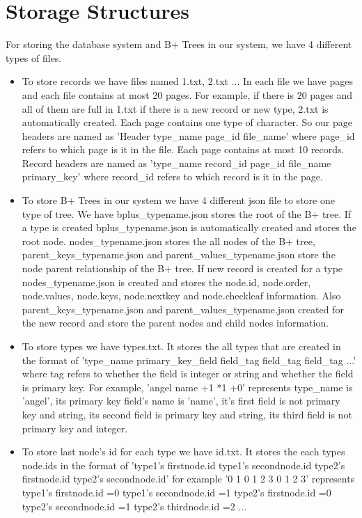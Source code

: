 \documentclass{article}
\begin{document}
\section{Storage Structures}
For storing the database system and B+ Trees in our system, we have 4 different types of files. \begin{itemize}
    \item To store records we have files named 1.txt, 2.txt ... In each file we have pages and each file contains at most 20 pages. For example, if there is 20 pages and all of them are full in 1.txt if there is a new record or new type, 2.txt is automatically created. Each page contains one type of character. So our page headers are named as 'Header type\_name page\_id file\_name' where page\_id refers to which page is it in the file. Each page contains at most 10 records. Record headers are named as 'type\_name record\_id page\_id file\_name primary\_key' where record\_id refers to which record is it in the page.
    \item To store B+ Trees in our system we have 4 different json file to store one type of tree.  We have bplus\_typename.json stores the root of the B+ tree. If a type is created bplus\_typename.json is automatically created and stores the root node. nodes\_typename.json stores the all nodes of the B+ tree, parent\_keys\_typename.json and parent\_values\_typename.json store the node parent relationship of the B+ tree. If new record is created for a type  nodes\_typename.json is created and stores the node.id, node.order, node.values, node.keys, node.nextkey and node.checkleaf information. Also parent\_keys\_typename.json and parent\_values\_typename.json created for the new record and store the parent nodes and child nodes information.
     \item To store types we have types.txt. It stores the all types that are created in the format of 'type\_name primary\_key\_field field\_tag field\_tag field\_tag ...' where tag refers to whether the field is integer or string and whether the field is primary key. For example, 'angel name +1 *1 +0' represents type\_name is 'angel', its primary key field's name is 'name', it's first field is not primary key and string, its second field is primary key and string, its third field is not primary key and integer.
    \item To store last node's id for each type we have id.txt. It stores the each types node.ids in the format of
    'type1's firstnode.id type1's secondnode.id type2's firstnode.id  type2's secondnode.id' for example 
    '0 1 0 1 2 3 0 1 2 3' represents type1's firstnode.id =0 type1's secondnode.id =1  type2's firstnode.id =0 type2's secondnode.id =1 type2's thirdnode.id =2 ...
\end{itemize}
\end{document}
